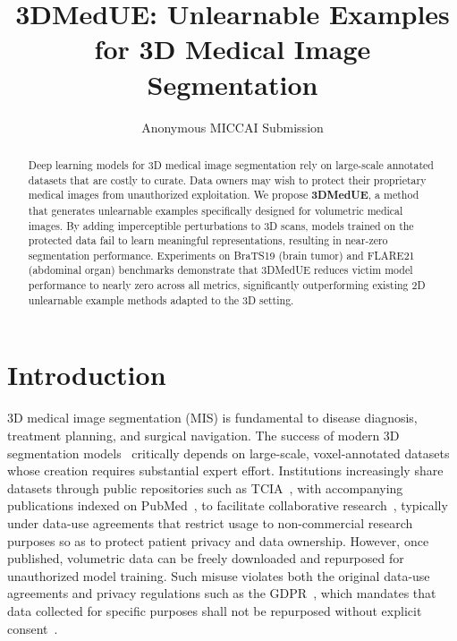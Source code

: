 \documentclass[runningheads]{llncs}
\begin{document}
%
\title{3DMedUE: Unlearnable Examples for 3D Medical Image Segmentation}
%
\author{Anonymous MICCAI Submission}
%
%
\maketitle
%
\begin{abstract}
Deep learning models for 3D medical image segmentation rely on large-scale
annotated datasets that are costly to curate. Data owners may wish to protect
their proprietary medical images from unauthorized exploitation. We propose
\textbf{3DMedUE}, a method that generates unlearnable examples specifically
designed for volumetric medical images. By adding imperceptible perturbations
to 3D scans, models trained on the protected data fail to learn meaningful
representations, resulting in near-zero segmentation performance. Experiments
on BraTS19 (brain tumor) and FLARE21 (abdominal organ) benchmarks demonstrate
that 3DMedUE reduces victim model performance to nearly zero across all
metrics, significantly outperforming existing 2D unlearnable example methods
adapted to the 3D setting.
%
\end{abstract}
%
\section{Introduction}\label{sec:intro}

3D medical image segmentation (MIS) is fundamental to disease diagnosis,
treatment planning, and surgical navigation. The success of modern 3D
segmentation
models~\cite{cciccek20163d,milletari2016v,isensee2021nnu,hatamizadeh2022unetr,tang2022swinunetr}
critically depends on large-scale, voxel-annotated datasets whose creation
requires substantial expert effort. Institutions increasingly share datasets
through public repositories such as TCIA~\cite{tcia}, with accompanying
publications indexed on PubMed~\cite{pubmed}, to facilitate collaborative
research~\cite{menze2014multimodal,ma2021abdomenct}, typically under
data-use agreements that restrict usage to non-commercial research purposes
so as to protect patient privacy and data ownership. However, once published, volumetric data can be
freely downloaded and repurposed for unauthorized model training. Such misuse
violates both the original data-use agreements and privacy regulations such as
the GDPR~\cite{gdpr2016}, which mandates that data collected for specific purposes shall not be
repurposed without explicit consent~\cite{kaissis2021end}.
\end{document}
